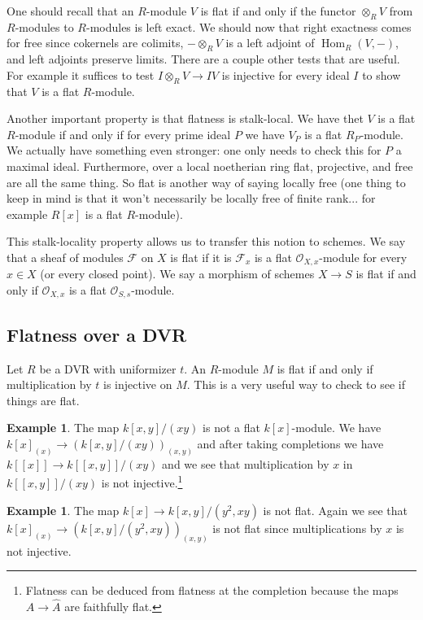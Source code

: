 \documentclass[12pt]{article}
\numberwithin{equation}{section}
\theoremstyle{definition}
\newtheorem{example}[theorem]{Example}
\theoremstyle{remark}
\newcommand{\Hom}{\operatorname{Hom}}
\newcommand{\Ocal}{\mathcal{O}}
\newcommand{\Fcal}{\mathcal{F}}
\begin{document}
One should recall that an $R$-module $V$ is flat if and only if the functor $\otimes_RV$ from $R$-modules to $R$-modules is left exact. 
We should now that right exactness comes for free since cokernels are colimits, $-\otimes_R V$ is a left adjoint of $\Hom_R(V,-)$, and left adjoints preserve limits. 
There are a couple other tests that are useful. 
For example it suffices to test $I\otimes_R V \to IV$ is injective for every ideal $I$ to show that $V$ is a flat $R$-module. 

Another important property is that flatness is stalk-local.
We have thet $V$ is a flat $R$-module if and only if for every prime ideal $P$ we have $V_P$ is a flat $R_P$-module. 
We actually have something even stronger: one only needs to check this for $P$ a maximal ideal.
Furthermore, over a local noetherian ring flat, projective, and free are all the same thing.
So flat is another way of saying locally free (one thing to keep in mind is that it won't necessarily be locally free of finite rank... for example $R[x]$ is a flat $R$-module). 

This stalk-locality property allows us to transfer this notion to schemes. 
We say that a sheaf of modules $\Fcal$ on $X$ is flat if it is $\Fcal_x$ is a flat $\Ocal_{X,x}$-module for every $x\in X$ (or every closed point). 
We say a morphism of schemes $X \to S$ is flat if and only if $\Ocal_{X,x}$ is a flat $\Ocal_{S,s}$-module. 



\subsection{Flatness over a DVR}
Let $R$ be a DVR with uniformizer $t$.
An $R$-module $M$ is flat if and only if multiplication by $t$ is injective on $M$. 
This is a very useful way to check to see if things are flat.

\begin{example}
	The map $k[x,y]/(xy)$ is not a flat $k[x]$-module. 
	We have $k[x]_{(x)} \to (k[x,y]/(xy))_{(x,y)}$ and after taking completions we have $k[[x]] \to k[[x,y]]/(xy)$ and we see that multiplication by $x$ in $k[[x,y]]/(xy)$ is not injective.\footnote{Flatness can be deduced from flatness at the completion because the maps $A \to \widehat{A}$ are faithfully flat.}
\end{example}

\begin{example}
	The map $k[x] \to k[x,y]/(y^2,xy)$ is not flat. 
	Again we see that $k[x]_{(x)} \to (k[x,y]/(y^2,xy))_{(x,y)}$ is not flat since multiplications by $x$ is not injective. 
\end{example}
\end{document}
